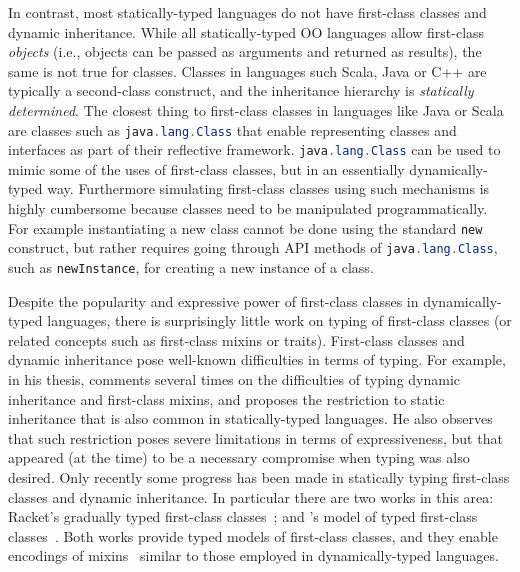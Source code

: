 In contrast, most statically-typed
languages do not have first-class classes and dynamic
inheritance. While all statically-typed OO languages allow first-class
\emph{objects} (i.e., objects can be passed as arguments and returned
as results), the same is not true for classes. Classes in languages such
Scala, Java or C++ are typically a second-class construct, and the
inheritance hierarchy is \emph{statically determined}. The closest thing
to first-class classes in
languages like Java or Scala are classes such as
\lstinline[language=java]{java.lang.Class} that enable representing classes and
interfaces as part of their reflective framework. \lstinline[language=java]{java.lang.Class} can be used to
mimic some of the uses of first-class classes, but in an essentially
dynamically-typed way. Furthermore simulating first-class classes
using such mechanisms is highly cumbersome because classes need to be
manipulated programmatically. For example instantiating a new class
cannot be done using the standard \lstinline{new} construct, but
rather requires going through API methods of
\lstinline[language=java]{java.lang.Class}, such as \lstinline{newInstance}, for
creating a new instance of a class.

Despite the popularity and expressive power of first-class classes in dynamically-typed
languages, there is surprisingly little work on typing of first-class
classes (or related concepts such as first-class mixins or traits).
First-class classes and dynamic inheritance pose well-known
difficulties in terms of typing. For example, in his thesis,
\citet{bracha1992programming} comments several times on the difficulties of typing
dynamic inheritance and first-class mixins, and proposes the
restriction to static inheritance that is also common in
statically-typed languages. He also observes that such restriction
poses severe limitations in terms of expressiveness, but that appeared
(at the time)
to be a necessary compromise when typing was also desired.
Only recently some progress has been made in statically typing
first-class classes and dynamic inheritance. In particular there are
two works in this area: Racket's gradually
typed first-class classes~\citep{DBLP:conf/oopsla/TakikawaSDTF12}; and \citeauthor{DBLP:conf/ecoop/LeeASP15}'s model of
typed first-class classes~\citep{DBLP:conf/ecoop/LeeASP15}. Both works provide typed models of
first-class classes, and they enable encodings of mixins~\citep{bracha1990mixin}
similar to those employed in dynamically-typed languages.

